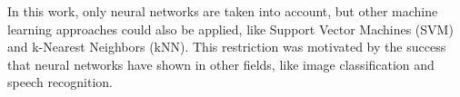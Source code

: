 In this work, only neural networks are taken into account, but other machine learning approaches could also be applied, like Support Vector Machines (SVM) and k-Nearest Neighbors (kNN). This restriction was motivated by the success that neural networks have shown in other fields, like image classification and speech recognition.

